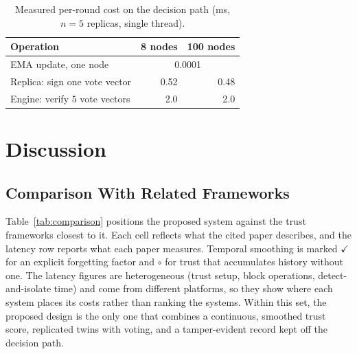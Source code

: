 \documentclass[lineno,pdflatex,sn-nature]{sn-jnl}
\theoremstyle{thmstyleone}%
\theoremstyle{thmstylethree}%
\begin{document}
\begin{table}[!t]
\caption{Measured per-round cost on the decision path (ms, $n=5$ replicas, single thread).}
\label{tab:latency}
\centering
\renewcommand{\arraystretch}{1.08}
\footnotesize
\setlength{\tabcolsep}{3pt}
\begin{tabular}{lrr}
\toprule
{Operation} & {8 nodes} & {100 nodes} \\
\midrule
EMA update, one node & \multicolumn{2}{c}{0.0001} \\
Replica: sign one vote vector & 0.52 & 0.48 \\
Engine: verify $5$ vote vectors & 2.0 & 2.0 \\
\bottomrule
\end{tabular}
\end{table}

\section{Discussion}
\label{sec:discussion}

\subsection{Comparison With Related Frameworks}
\label{sec:res-comparison}
Table~\ref{tab:comparison} positions the proposed system against the
trust frameworks closest to it.  Each cell reflects what the cited
paper describes, and the latency row reports what each paper measures.
Temporal smoothing is marked $\checkmark$ for an explicit forgetting
factor and $\circ$ for trust that accumulates history without one.
The latency figures are heterogeneous (trust setup, block operations,
detect-and-isolate time) and come from different platforms, so they
show where each system places its costs rather than ranking the
systems.  Within this set, the proposed design is the only one that
combines a continuous, smoothed trust score, replicated twins with
voting, and a tamper-evident record kept off the decision path.
\end{document}

